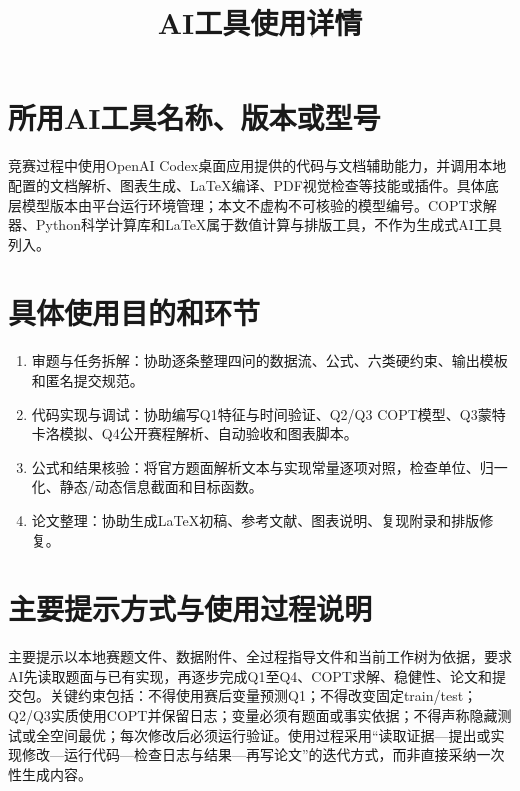 \documentclass[UTF8,a4paper,zihao=-4,fontset=fandol]{ctexart}
\title{AI工具使用详情}
\author{}
\date{}
\begin{document}
\maketitle

\section{所用AI工具名称、版本或型号}
竞赛过程中使用OpenAI Codex桌面应用提供的代码与文档辅助能力，并调用本地配置的文档解析、图表生成、LaTeX编译、PDF视觉检查等技能或插件。具体底层模型版本由平台运行环境管理；本文不虚构不可核验的模型编号。COPT求解器、Python科学计算库和LaTeX属于数值计算与排版工具，不作为生成式AI工具列入。

\section{具体使用目的和环节}
\begin{enumerate}[label=\arabic*.]
  \item 审题与任务拆解：协助逐条整理四问的数据流、公式、六类硬约束、输出模板和匿名提交规范。
  \item 代码实现与调试：协助编写Q1特征与时间验证、Q2/Q3 COPT模型、Q3蒙特卡洛模拟、Q4公开赛程解析、自动验收和图表脚本。
  \item 公式和结果核验：将官方题面解析文本与实现常量逐项对照，检查单位、归一化、静态/动态信息截面和目标函数。
  \item 论文整理：协助生成LaTeX初稿、参考文献、图表说明、复现附录和排版修复。
\end{enumerate}

\section{主要提示方式与使用过程说明}
主要提示以本地赛题文件、数据附件、全过程指导文件和当前工作树为依据，要求AI先读取题面与已有实现，再逐步完成Q1至Q4、COPT求解、稳健性、论文和提交包。关键约束包括：不得使用赛后变量预测Q1；不得改变固定train/test；Q2/Q3实质使用COPT并保留日志；变量必须有题面或事实依据；不得声称隐藏测试或全空间最优；每次修改后必须运行验证。使用过程采用“读取证据---提出或实现修改---运行代码---检查日志与结果---再写论文”的迭代方式，而非直接采纳一次性生成内容。
\end{document}
